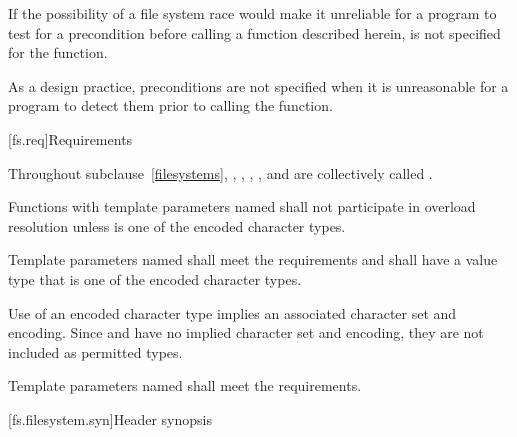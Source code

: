 \pnum
If the possibility of a file system race would make it unreliable for a
program to test for a precondition before calling a function described herein,
{}\expects is not specified for the function.
\begin{note}
As a design practice, preconditions are not specified when it
is unreasonable for a program to detect them prior to calling the function.
\end{note}

[fs.req]{Requirements}

\pnum
Throughout subclause~\ref{filesystems}, , , ,
, and  are collectively called
.

\pnum
Functions with template parameters named 
shall not participate in overload resolution
unless  is one of the encoded character types.

\pnum
Template parameters named  shall meet the
 requirements and shall
have a value type that is one of the encoded character types.

\pnum
\begin{note}
Use of an encoded character type implies an associated
character set and encoding.
Since  and  have no
implied character set and encoding,
they are not included as permitted types.
\end{note}

\pnum
Template parameters named  shall meet
the  requirements.

[fs.filesystem.syn]{Header  synopsis}


